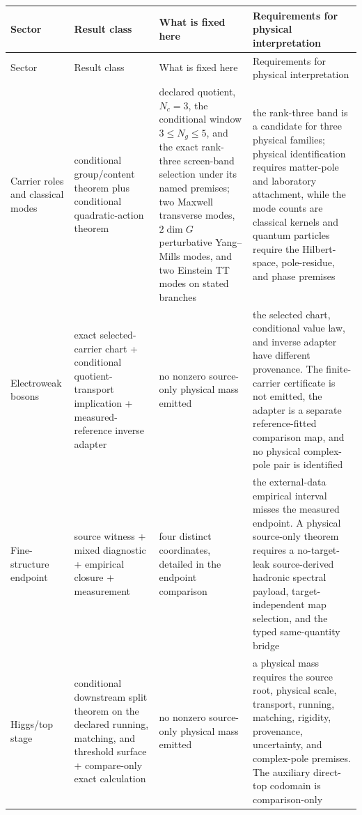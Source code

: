 \scriptsize
\setlength{\tabcolsep}{2pt}
\begin{longtable}{@{}>{\raggedright\arraybackslash}p{}>{\raggedright\arraybackslash}p{}>{\raggedright\arraybackslash}p{}>{\raggedright\arraybackslash}p{}@{}}
\toprule
Sector & Result class & What is fixed here & Requirements for physical interpretation \\
\midrule
\endfirsthead
\toprule
Sector & Result class & What is fixed here & Requirements for physical interpretation \\
\midrule
\endhead
\bottomrule
\endfoot
Carrier roles and classical modes & conditional group/content theorem plus conditional quadratic-action theorem & declared quotient, \(N_c=3\), the conditional window \(3\le N_g\le5\), and the exact rank-three screen-band selection under its named premises; two Maxwell transverse modes, \(2\dim G\) perturbative Yang--Mills modes, and two Einstein TT modes on stated branches & the rank-three band is a candidate for three physical families; physical identification requires matter-pole and laboratory attachment, while the mode counts are classical kernels and quantum particles require the Hilbert-space, pole-residue, and phase premises \\
Electroweak bosons & exact selected-carrier chart + conditional quotient-transport implication + measured-reference inverse adapter & no nonzero source-only physical mass emitted & the selected chart, conditional value law, and inverse adapter have different provenance. The finite-carrier certificate is not emitted, the adapter is a separate reference-fitted comparison map, and no physical complex-pole pair is identified \\
Fine-structure endpoint & source witness + mixed diagnostic + empirical closure + measurement & four distinct coordinates, detailed in the endpoint comparison & the external-data empirical interval misses the measured endpoint. A physical source-only theorem requires a no-target-leak source-derived hadronic spectral payload, target-independent map selection, and the typed same-quantity bridge \\
Higgs/top stage & conditional downstream split theorem on the declared running, matching, and threshold surface + compare-only exact calculation & no nonzero source-only physical mass emitted & a physical mass requires the source root, physical scale, transport, running, matching, rigidity, provenance, uncertainty, and complex-pole premises. The auxiliary direct-top codomain is comparison-only \\

\end{longtable}
